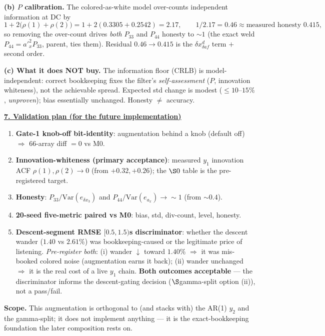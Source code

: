 \documentclass[11pt,a4paper,fontset=none]{ctexart}
\newcommand{\hd}[1]{\par\medskip\noindent\underline{\textbf{#1}}\par\nobreak\vspace{0.2ex}}
\begin{document}
\textbf{(b) $P$ calibration.} The colored-as-white model over-counts independent information at DC by
\[ 1+2\big(\rho(1)+\rho(2)\big) = 1+2(0.3305+0.2542) = 2.17,
\qquad 1/2.17 = 0.46 \approx \text{measured honesty }0.415, \]
so removing the over-count drives \emph{both} $P_{33}$ and $P_{44}$ honesty to ${\sim}1$ (the exact weld $P_{44}=a'^2_xP_{33}$, parent, ties them). Residual $0.46\!\to\!0.415$ is the $\delta x^{d}_{\delta af}$ term $+$ second order.

\textbf{(c) What it does NOT buy.} The information floor (CRLB) is model-independent: correct bookkeeping fixes the filter's \emph{self-assessment} ($P$, innovation whiteness), not the achievable spread. Expected std change is modest (${\le}10\text{--}15\%$, \emph{unproven}); bias essentially unchanged. Honesty $\ne$ accuracy.

\hd{7. Validation plan (for the future implementation)}
\begin{enumerate}[leftmargin=1.6em,topsep=2pt,itemsep=3pt]
\item \textbf{Gate-1 knob-off bit-identity}: augmentation behind a knob (default off) $\Rightarrow$ 66-array diff $=0$ vs M0.
\item \textbf{Innovation-whiteness (primary acceptance)}: measured $y_1$ innovation ACF $\rho(1),\rho(2)\!\to\!0$ (from $+0.32,+0.26$); the $\S 0$ table is the pre-registered target.
\item \textbf{Honesty}: $P_{33}/\mathrm{Var}(e_{\delta x_3})$ and $P_{44}/\mathrm{Var}(e_{a_x})\to{\sim}1$ (from ${\sim}0.4$).
\item \textbf{20-seed five-metric paired vs M0}: bias, std, div-count, level, honesty.
\item \textbf{Descent-segment RMSE $[0.5,1.5)$s discriminator}: whether the descent wander ($1.40$ vs $2.61\%$) was bookkeeping-caused or the legitimate price of listening. \emph{Pre-register both}: (i) wander $\downarrow$ toward $1.40\%$ $\Rightarrow$ it was mis-booked colored noise (augmentation earns it back); (ii) wander unchanged $\Rightarrow$ it is the real cost of a live $y_1$ chain. \textbf{Both outcomes acceptable} --- the discriminator informs the descent-gating decision ($\S$gamma-split option (ii)), not a pass/fail.
\end{enumerate}

\textbf{Scope.} This augmentation is orthogonal to (and stacks with) the AR(1) $y_2$ and the gamma-split; it does not implement anything --- it is the exact-bookkeeping foundation the later composition rests on.
\end{document}
